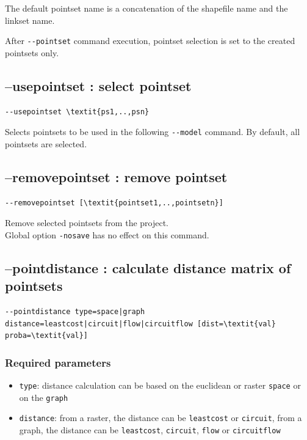 \documentclass[a4paper,10pt]{report}
\begin{document}
The default pointset name is a concatenation of the shapefile name and the linkset name.

After \verb|--pointset| command execution, pointset selection is set to the created pointsets only.

\subsection{--usepointset : select pointset}
\begin{Verbatim}[commandchars=\\\{\}]
--usepointset \textit{ps1,..,psn}
\end{Verbatim}
Selects pointsets to be used in the following \verb|--model| command.
By default, all pointsets are selected.

\subsection{--removepointset : remove pointset}
\begin{Verbatim}[commandchars=\\\{\}]
--removepointset [\textit{pointset1,..,pointsetn}]
\end{Verbatim}
Remove selected pointsets from the project.\\
Global option \verb|-nosave| has no effect on this command.


\subsection{--pointdistance : calculate distance matrix of pointsets}
\begin{Verbatim}[commandchars=\\\{\}]
--pointdistance type=space|graph distance=leastcost|circuit|flow|circuitflow [dist=\textit{val} proba=\textit{val}]
\end{Verbatim}

\subsubsection{Required parameters}
\begin{itemize}
	\item \verb|type|: distance calculation can be based on the euclidean or raster \verb|space| or on the \verb|graph|
	\item \verb|distance|: from a raster, the distance can be \verb|leastcost| or \verb|circuit|, from a graph, the distance can be \verb|leastcost|, \verb|circuit|, \verb|flow| or \verb|circuitflow|
\end{itemize}
\end{document}
